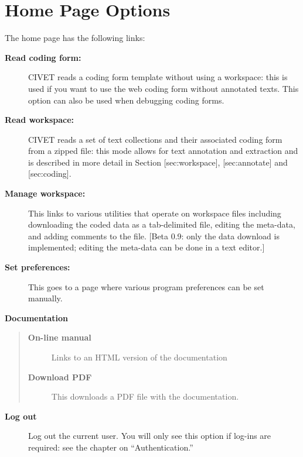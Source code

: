 \documentclass[letterpaper,10pt,english]{sphinxmanual}
\begin{document}
\chapter{Home Page Options}
\label{homepage:home-page-options}\label{homepage::doc}
The home page has the following links:
\begin{description}
\item[{\textbf{Read coding form:}}] \leavevmode
CIVET reads a coding form template without using a workspace: this
is used if you want to use the web coding form without annotated
texts. This option can also be used when debugging coding forms.

\item[{\textbf{Read workspace:}}] \leavevmode
CIVET reads a set of text collections and their associated coding
form from a zipped file: this mode allows for text annotation and
extraction and is described in more detail in Section
{[}sec:workspace{]}, {[}sec:annotate{]} and {[}sec:coding{]}.

\item[{\textbf{Manage workspace:}}] \leavevmode
This links to various utilities that operate on workspace files
including downloading the coded data as a
tab-delimited file, editing the meta-data, and adding comments to
the file. {[}Beta 0.9: only the data download is implemented; editing
the meta-data can be done in a text editor.{]}

\item[{\textbf{Set preferences:}}] \leavevmode
This goes to a page where various program preferences can be set
manually.

\end{description}

\textbf{Documentation}
\begin{quote}
\begin{description}
\item[{\textbf{On-line manual}}] \leavevmode
Links to an HTML version of the documentation

\item[{\textbf{Download PDF}}] \leavevmode
This downloads a PDF file with the documentation.

\end{description}
\end{quote}
\begin{description}
\item[{\textbf{Log out}}] \leavevmode
Log out the current user. You will only see this option if log-ins
are required: see the chapter on “Authentication.”

\end{description}
\end{document}
